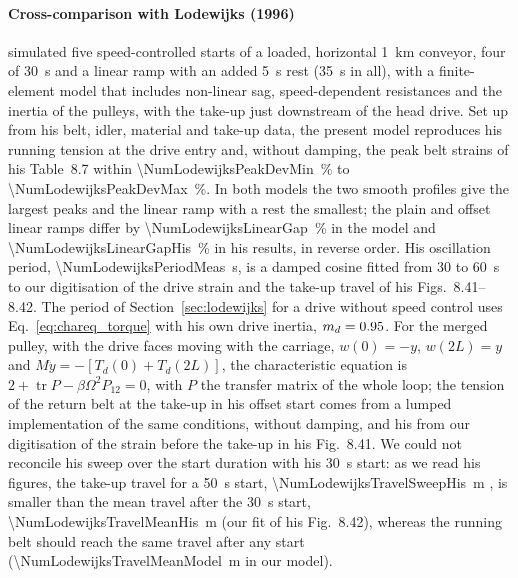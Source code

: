 \paragraph{Cross-comparison with Lodewijks (1996)}\label{sec:crosscheck}
 simulated five speed-controlled starts of a loaded, horizontal
\qty{1}{\kilo\metre} conveyor, four of \qty{30}{\second} and a linear ramp with an added
\qty{5}{\second} rest (\qty{35}{\second} in all), with a finite-element model that includes
non-linear sag, speed-dependent resistances and the inertia of the pulleys, with the take-up just
downstream of the head drive. Set up from his belt, idler, material and take-up data, the present
model reproduces his running tension at the drive entry and, without damping, the peak belt
strains of his Table~8.7 within \qty{\NumLodewijksPeakDevMin}{\percent} to
\qty{\NumLodewijksPeakDevMax}{\percent}. In both models the two smooth profiles give the largest
peaks and the linear ramp with a rest the smallest; the plain and offset linear ramps differ by
\qty{\NumLodewijksLinearGap}{\percent} in the model and \qty{\NumLodewijksLinearGapHis}{\percent}
in his results, in reverse order. His oscillation period, \qty{\NumLodewijksPeriodMeas}{\second},
is a damped cosine fitted from 30 to \qty{60}{\second} to our digitisation of the drive strain and
the take-up travel of his Figs.~8.41--8.42. The period of Section~\ref{sec:lodewijks} for a
drive without speed control uses Eq.~\eqref{eq:chareq_torque} with his own drive inertia,
$m_d=0.95$. For the merged pulley, with the drive faces moving with the
carriage, $w(0)=-y$, $w(2L)=y$ and $M\ddot y=-[T_d(0)+T_d(2L)]$, the characteristic equation is
$2+\operatorname{tr}P-\beta\Omega^2P_{12}=0$, with $P$ the transfer matrix of the whole loop; the
tension of the return belt at the take-up in his offset start comes from a lumped implementation
of the same conditions, without damping, and his from our digitisation of the strain before the
take-up in his Fig.~8.41. We could not reconcile his sweep over the start duration with his
\qty{30}{\second} start: as we read his figures, the take-up travel for a \qty{50}{\second}
start, \qty{\NumLodewijksTravelSweepHis}{\metre} \citep[Fig.~8.46]{lodewijks1996}, is smaller
than the mean travel after the \qty{30}{\second} start, \qty{\NumLodewijksTravelMeanHis}{\metre}
(our fit of his Fig.~8.42), whereas the running belt should reach the same travel after any
start (\qty{\NumLodewijksTravelMeanModel}{\metre} in our model).

